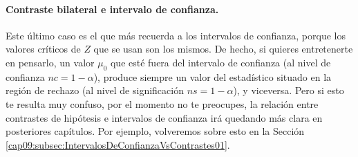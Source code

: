 \paragraph{Contraste bilateral e intervalo de confianza.}
\label{cap07:lugar:ContrasteBilateralIntervaloConfianza}
Este último caso es el que más recuerda a los intervalos de confianza, porque los valores críticos de $Z$ que se usan son los mismos. De hecho, si quieres entretenerte en pensarlo, un valor $\mu_0$ que esté fuera del intervalo de confianza (al nivel de confianza $nc=1-\alpha$), produce siempre un valor del estadístico situado en la región de rechazo (al nivel de significación $ns=1-\alpha$), y viceversa. Pero si esto te resulta muy confuso, por el momento no te preocupes, la relación entre contrastes de hipótesis e intervalos de confianza irá quedando más clara en posteriores capítulos. Por ejemplo, volveremos sobre esto en la Sección \ref{cap09:subsec:IntervalosDeConfianzaVsContrastes01}.\\

